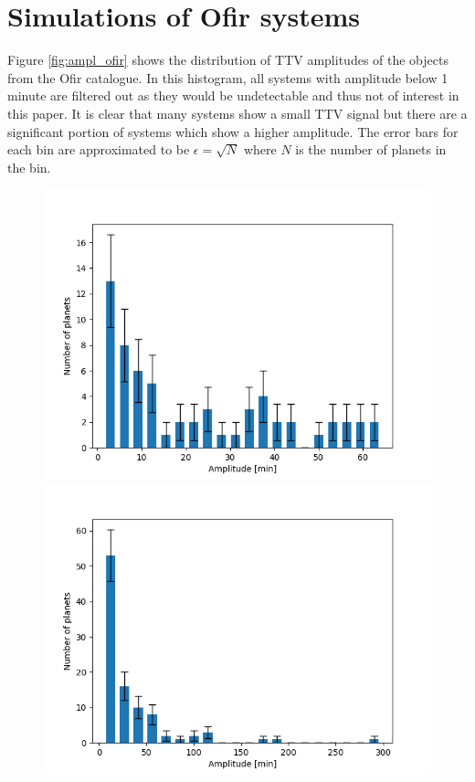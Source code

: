 \documentclass[12pt]{report}
\begin{document}
\section{Simulations of Ofir systems}
	Figure \ref{fig:ampl_ofir} shows the distribution of TTV amplitudes of the objects from the Ofir catalogue. In this histogram, all systems with amplitude below 1 minute are filtered out as they would be undetectable and thus not of interest in this paper. It is clear that many systems show a small TTV signal but there are a significant portion of systems which show a higher amplitude. The error bars for each bin are approximated to be $\epsilon = \sqrt{N}$ where $N$ is the number of planets in the bin.

\begin{figure}
\centering
\begin{minipage}{.5\textwidth}
  \centering
  \includegraphics[width=1\linewidth]{img/ampl_ofir_66.png}
 

\end{minipage}%
\begin{minipage}{.5\textwidth}
  \centering
  \includegraphics[width=1\linewidth]{img/ampl_tess_400.png}
  


\end{minipage}
\end{figure}
\end{document}
